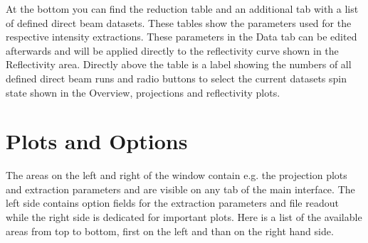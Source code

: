   At the bottom you can find the reduction table and an additional tab with a list of defined direct beam datasets.
  These tables show the parameters used for the respective intensity extractions.
  These parameters in the Data tab can be edited afterwards and will be applied directly to the reflectivity curve shown in the Reflectivity area.
  Directly above the table is a label showing the numbers of all defined direct beam runs and radio buttons to select the current datasets spin state shown in the Overview, projections and reflectivity plots.
  
\section{Plots and Options}
  The areas on the left and right of the window contain e.g. the projection plots and extraction parameters and are visible on any tab of the main interface. The left side contains option fields for the extraction parameters and file readout while the right side is dedicated for important plots.
  Here is a list of the available areas from top to bottom, first on the left and than on the right hand side.
  

